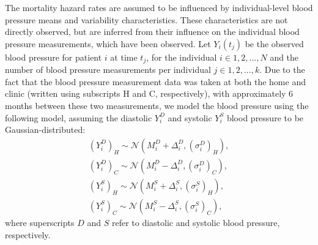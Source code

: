 \documentclass[
]{article}
\begin{document}
The mortality hazard rates are assumed to be influenced by individual-level blood pressure means and variability characteristics.
These characteristics are not directly observed, but are inferred from their influence on the individual blood pressure measurements, which have been observed.
Let \(Y_i(t_j)\) be the observed blood pressure for patient \(i\) at time \(t_j\), for the individual \(i\in 1,2,...,N\) and the number of blood pressure measurements per individual \(j\in 1,2,...,k\). Due to the fact that the blood pressure measurement data was taken at both the home and clinic (written using subscripts H and C, respectively), with approximately 6 months between these two measurements, we model the blood pressure using the following model, assuming the diastolic \(Y_{i}^D\) and systolic \(Y_{i}^S\) blood pressure to be Gaussian-distributed:
\begin{equation}\label{bp}
\begin{aligned}
  (Y_{i}^D)_{H} \sim \mathcal{N}(M_i^D+\Delta_i^D,(\sigma_i^D)_H),\\
  (Y_{i}^D)_{C} \sim \mathcal{N}(M_i^D-\Delta_i^D,(\sigma_i^D)_C),\\
  (Y_{i}^S)_{H} \sim \mathcal{N}(M_i^S+\Delta_i^S,(\sigma_i^S)_H),\\
  (Y_{i}^S)_{C} \sim \mathcal{N}(M_i^S-\Delta_i^S,(\sigma_i^S)_C),
\end{aligned}
\end{equation}
where superscripts \(D\) and \(S\) refer to diastolic and systolic blood pressure, respectively.
\end{document}
